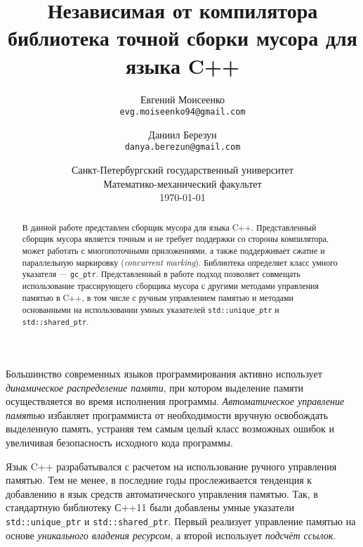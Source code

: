 \documentclass[10pt]{article}
\title{Независимая от компилятора библиотека точной сборки мусора для языка C++}
\author{
        Евгений Моисеенко\\ \texttt{evg.moiseenko94@gmail.com}
            \and
        Даниил Березун\\ \texttt{danya.berezun@gmail.com}
}
\date{
  Санкт-Петербургский государственный университет\\
  Математико-механический факультет\\
  \today
}
\newcommand{\code}{\texttt}
\begin{document}
\maketitle

\begin{abstract}
В данной работе представлен сборщик мусора для языка C++.
Представленный сборщик мусора является точным и не требует поддержки со стороны компилятора,
может работать с многопоточными приложениями,
а также поддерживает сжатие и параллельную маркировку (\emph{concurrent marking}).
Библиотека определяет класс умного указателя --- \code{gc\_ptr}.
Представленный в работе подход позволяет совмещать использование 
трассирующего сборщика мусора с другими методами управления памятью в C++, 
в том числе с ручным управлением памятью и методами основанными на использовании
умных указателей \code{std::unique\_ptr} и \code{std::shared\_ptr}. 

\end{abstract}

Большинство современных языков программирования активно использует \emph{динамическое распределение памяти}, 
при котором выделение памяти осуществляется во время исполнения программы. 
\emph{Автоматическое управление памятью} избавляет программиста от необходимости 
вручную освобождать выделенную память, 
устраняя тем самым целый класс возможных ошибок и 
увеличивая безопасность исходного кода программы. 


Язык C++ разрабатывался с расчетом на использование ручного управления памятью.
Тем не менее, в последние годы прослеживается тенденция к добавлению в язык 
средств автоматического управления памятью. 
Так, в стандартную библиотеку С++11 были добавлены 
умные указатели \code{std::unique\_ptr} и \code{std::shared\_ptr}. 
Первый реализует управление памятью на основе \emph{уникального владения ресурсом},
а второй использует \emph{подсчёт ссылок}. 
\end{document}
